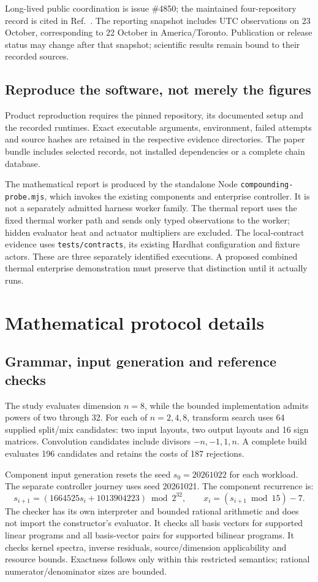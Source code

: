 \documentclass[11pt,a4paper]{article}
\begin{document}
Long-lived public coordination is issue \#4850; the maintained four-repository record is cited in Ref.~\cite{compatibility}. The reporting snapshot includes UTC observations on 23 October, corresponding to 22 October in America/Toronto. Publication or release status may change after that snapshot; scientific results remain bound to their recorded sources.

\subsection{Reproduce the software, not merely the figures}
Product reproduction requires the pinned repository, its documented setup and the recorded runtimes. Exact executable arguments, environment, failed attempts and source hashes are retained in the respective evidence directories. The paper bundle includes selected records, not installed dependencies or a complete chain database.

The mathematical report is produced by the standalone Node \texttt{compounding-probe.mjs}, which invokes the existing components and enterprise controller. It is not a separately admitted harness worker family. The thermal report uses the fixed thermal worker path and sends only typed observations to the worker; hidden evaluator heat and actuator multipliers are excluded. The local-contract evidence uses \texttt{tests/contracts}, its existing Hardhat configuration and fixture actors. These are three separately identified executions. A proposed combined thermal enterprise demonstration must preserve that distinction until it actually runs.

\section{Mathematical protocol details}\label{app:math}
\subsection{Grammar, input generation and reference checks}
The study evaluates dimension \(n=8\), while the bounded implementation admits powers of two through 32. For each of \(n=2,4,8\), transform search uses 64 supplied split/mix candidates: two input layouts, two output layouts and 16 sign matrices. Convolution candidates include divisors \(-n,-1,1,n\). A complete build evaluates 196 candidates and retains the costs of 187 rejections.

Component input generation resets the seed \(s_0=20261022\) for each workload. The separate controller journey uses seed 20261021. The component recurrence is:
\begin{equation}
s_{i+1}=(1664525s_i+1013904223)\bmod 2^{32},
\qquad x_i=(s_{i+1}\bmod15)-7.
\end{equation}
The checker has its own interpreter and bounded rational arithmetic and does not import the constructor's evaluator. It checks all basis vectors for supported linear programs and all basis-vector pairs for supported bilinear programs. It checks kernel spectra, inverse residuals, source/dimension applicability and resource bounds. Exactness follows only within this restricted semantics; rational numerator/denominator sizes are bounded.
\end{document}
